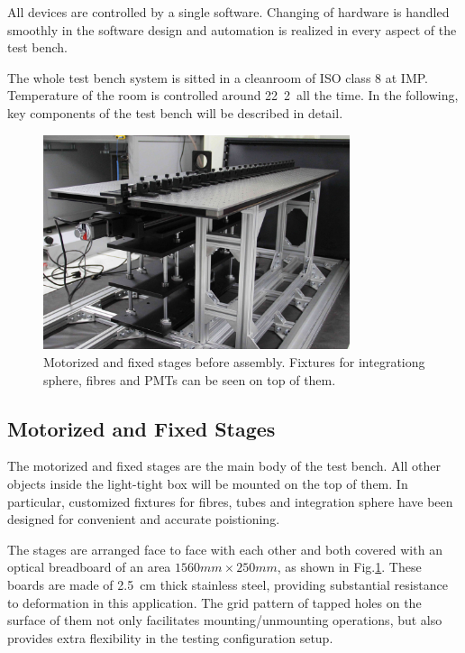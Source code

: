 \documentclass[5p, times]{elsarticle}
\begin{document}
All devices are controlled by a single software.
Changing of hardware is handled smoothly in the software design and automation is realized in every aspect of the test bench.

The whole test bench system is sitted in a cleanroom of ISO class 8 at IMP.
Temperature of the room is controlled around 22\textpm~2\textcelsius~all the time.
In the following, key components of the test bench will be described in detail.

\begin{figure}
 \centering
 \includegraphics[width=90mm]{stage1_crop}
\caption{Motorized and fixed stages before assembly.
Fixtures for integrationg sphere, fibres and PMTs can be seen on top of them.}
\label{fig:stages}
\end{figure} 

\subsection{Motorized and Fixed Stages}
\label{sec:stages}

The motorized and fixed stages are the main body of the test bench.
All other objects inside the light-tight box will be mounted on the top of them.
In particular, customized fixtures for fibres, tubes and integration sphere have been designed for convenient and accurate poistioning.

The stages are arranged face to face with each other and both covered with an optical breadboard of an area $1560mm\times250mm$, as shown in Fig.\ref{fig:stages}.
These boards are made of \SI{2.5}{cm} thick stainless steel, providing substantial resistance to deformation in this application.
The grid pattern of tapped holes on the surface of them not only facilitates mounting/unmounting operations, but also provides extra flexibility in the testing configuration setup.
\end{document}
